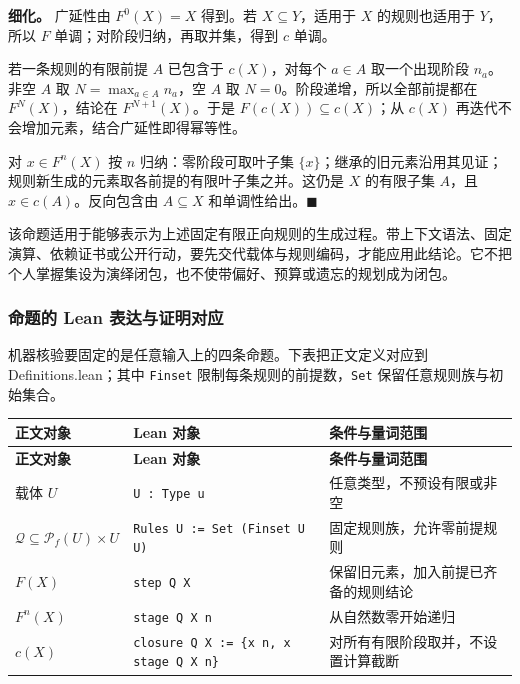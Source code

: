 \documentclass[UTF8,a4paper,zihao=-4,fontset=windows,openany]{ctexbook}
\def\ensuremath#1{#1}%
\newcommand{\mcsbrk}{\penalty 200\relax}
\begin{document}
\textbf{细化。} 广延性由 \(F^0(X)=X\) 得到。若 \(X\subseteq Y\)，适用于 \(X\) 的规则也适用于 \(Y\)，所以 \(F\) 单调；对阶段归纳，再取并集，得到 \(c\) 单调。

若一条规则的有限前提 \(A\) 已包含于 \(c(X)\)，对每个 \(a\in A\) 取一个出现阶段 \(n_a\)。非空 \(A\) 取 \(N=\max_{a\in A}n_a\)，空 \(A\) 取 \(N=0\)。阶段递增，所以全部前提都在 \(F^N(X)\)，结论在 \(F^{N+1}(X)\)。于是 \(F(c(X))\subseteq c(X)\)；从 \(c(X)\) 再迭代不会增加元素，结合广延性即得幂等性。

对 \(x\in F^n(X)\) 按 \(n\) 归纳：零阶段可取叶子集 \(\{x\}\)；继承的旧元素沿用其见证；规则新生成的元素取各前提的有限叶子集之并。这仍是 \(X\) 的有限子集 \(A\)，且 \(x\in c(A)\)。反向包含由 \(A\subseteq X\) 和单调性给出。\(\blacksquare\)

该命题适用于能够表示为上述固定有限正向规则的生成过程。带上下文语法、固定演算、依赖证书或公开行动，要先交代载体与规则编码，才能应用此结论。它不把个人掌握集设为演绎闭包，也不使带偏好、预算或遗忘的规划成为闭包。

\subsubsection{命题的 Lean 表达与证明对应}
机器核验要固定的是任意输入上的四条命题。下表把正文定义对应到 Definitions.lean；其中 \texttt{Finset} 限制每条规则的前提数，\texttt{Set} 保留任意规则族与初始集合。

\begingroup\small\setlength{\tabcolsep}{4pt}
\begin{longtable}{>{\raggedright\arraybackslash}p{}>{\raggedright\arraybackslash}p{}>{\raggedright\arraybackslash}p{}}
\toprule
\textbf{正文对象} & \textbf{Lean 对象} & \textbf{条件与量词范围} \\
\midrule
\endfirsthead
\toprule
\textbf{正文对象} & \textbf{Lean 对象} & \textbf{条件与量词范围} \\
\midrule
\endhead
\bottomrule
\endfoot
\bottomrule
\endlastfoot
载体 \(U\) & \texttt{U : Type u} & 任意类型，不预设有限或非空 \\
\(\mathcal Q\subseteq\mathcal P_f(U)\times U\) & \texttt{Rules U := Set (Finset U \ensuremath{\times} U)} & 固定规则族，允许零前提规则 \\
\(F(X)\) & \texttt{step Q X} & 保留旧元素，加入前提已齐备的规则结论 \\
\(F^n(X)\) & \texttt{stage Q X n} & 从自然数零开始递归 \\
\(c(X)\) & \texttt{closure Q X := \{x \ensuremath{\mid} \ensuremath{\exists} n,\mcsbrk{} x \ensuremath{\in} stage Q X n\}} & 对所有有限阶段取并，不设置计算截断 \\
\end{longtable}
\endgroup
\end{document}

